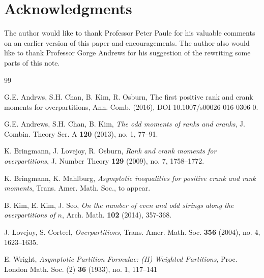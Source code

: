 \documentclass[11pt,reqno]{amsart}
\theoremstyle{definition}
\numberwithin{equation}{section}
\begin{document}
\section*{Acknowledgments}
The author would like to thank Professor Peter Paule  for his valuable comments on an earlier version of this paper and encouragements.
The author also would like to thank Professor Gorge Andrews  for his suggestion of the rewriting some parts of this note. 
\begin{thebibliography}{99}

G.E. Andrws, S.H. Chan, B. Kim, R. Osburn, The first positive rank and crank moments for overpartitions, Ann. Comb.  (2016),  DOI 10.1007/s00026-016-0306-0.

G.E. Andrews, S.H. Chan, B. Kim, \emph{The odd moments of ranks and cranks}, J. Combin. Theory Ser. A \textbf{120} (2013), no. 1, 77--91.


K. Bringmann, J. Lovejoy, R. Osburn, \emph{Rank and crank moments for overpartitions}, J. Number Theory \textbf{129} (2009), no. 7, 1758--1772.

K. Bringmann, K. Mahlburg, \emph{Asymptotic inequalities for positive crank and rank moments}, Trans. Amer. Math. Soc., to appear.

B. Kim, E. Kim, J. Seo, \emph{On the number of even and odd strings along the overpartitions of $n$}, Arch. Math.  \textbf{102}  (2014),  357-368.



J. Lovejoy, S. Corteel, \emph{Overpartitions}, Trans. Amer. Math. Soc. \textbf{356} (2004), no. 4, 1623--1635.

E. Wright, \emph{Asymptotic Partition Formulae: (II) Weighted Partitions}, Proc. London Math. Soc. (2) \textbf{36} (1933), no. 1, 117--141



\end{thebibliography}
\end{document}
